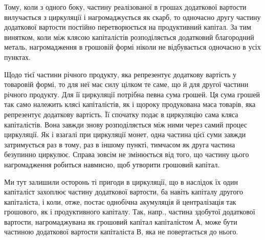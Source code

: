
Тому, коли з одного боку, частину реалізованої в грошах додаткової
вартости вилучається з циркуляції і нагромаджується як скарб, то одночасно
другу частину додаткової вартости постійно перетворюється на
продуктивний капітал. За тим винятком, коли між клясою капіталістів
розподіляється додатковий благородний металь, нагромадження в грошовій
формі ніколи не відбувається одночасно в усіх пунктах.

Щодо тієї частини річного продукту, яка репрезентує додаткову
вартість у товаровій формі, то для неї має силу цілком те саме, що й
для другої частини річного продукту. Для її циркуляції потрібна певна
сума грошей. Ця сума грошей так само належить клясі капіталістів, як
і щороку продукована маса товарів, яка репрезентує додаткову вартість.
Її спочатку подає в циркуляцію сама кляса капіталістів. Вона завжди
знову розподіляється між ними через самий процес циркуляції. Як і взагалі
при циркуляції монет, одна частина цієї суми завжди затримується
раз в тому, раз в іншому пункті, тимчасом як друга частина безупинно
циркулює. Справа зовсім не змінюється від того, що частину цього нагромадження
робиться навмисно, щоб утворити грошовий капітал.

Ми тут залишили осторонь ті пригоди в циркуляції, що в наслідок
їх один капіталіст захоплює частину додаткової вартости, ба навіть
капіталу другого капіталіста, і коли, отже, постає однобічна акумуляція
й централізація так грошового, як і продуктивного капіталу. Так, напр.,
частина здобутої додаткової вартости, нагромаджувана як грошовий
капітал капіталістом $А$, може бути частиною додаткової вартости капіталіста
$В$, яка не повертається до нього.
\label{original-266}
